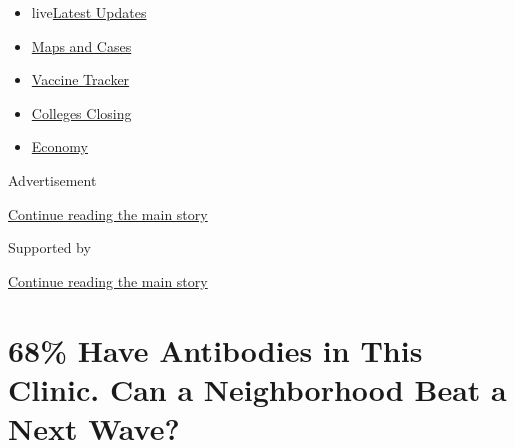 \begin{itemize}
\tightlist
\item
  live\href{https://www.nytimes3xbfgragh.onion/2020/08/20/world/coronavirus-covid.html?name=styln-coronavirus-national\&region=TOP_BANNER\&variant=undefined\&block=storyline_menu_recirc\&action=click\&pgtype=Article\&impression_id=3583c991-e38b-11ea-97c1-25b780906619}{Latest
  Updates}
\item
  \href{https://www.nytimes3xbfgragh.onion/interactive/2020/us/coronavirus-us-cases.html?name=styln-coronavirus-national\&region=TOP_BANNER\&variant=undefined\&block=storyline_menu_recirc\&action=click\&pgtype=Article\&impression_id=3583c992-e38b-11ea-97c1-25b780906619}{Maps
  and Cases}
\item
  \href{https://www.nytimes3xbfgragh.onion/interactive/2020/science/coronavirus-vaccine-tracker.html?name=styln-coronavirus-national\&region=TOP_BANNER\&variant=undefined\&block=storyline_menu_recirc\&action=click\&pgtype=Article\&impression_id=3583c993-e38b-11ea-97c1-25b780906619}{Vaccine
  Tracker}
\item
  \href{https://www.nytimes3xbfgragh.onion/2020/08/19/us/colleges-closing-covid.html?name=styln-coronavirus-national\&region=TOP_BANNER\&variant=undefined\&block=storyline_menu_recirc\&action=click\&pgtype=Article\&impression_id=3583c994-e38b-11ea-97c1-25b780906619}{Colleges
  Closing}
\item
  \href{https://www.nytimes3xbfgragh.onion/live/2020/08/20/business/stock-market-today-coronavirus?name=styln-coronavirus-national\&region=TOP_BANNER\&variant=undefined\&block=storyline_menu_recirc\&action=click\&pgtype=Article\&impression_id=3583c995-e38b-11ea-97c1-25b780906619}{Economy}
\end{itemize}

Advertisement

\protect\hyperlink{after-top}{Continue reading the main story}

Supported by

\protect\hyperlink{after-sponsor}{Continue reading the main story}

\hypertarget{68-have-antibodies-in-this-clinic-can-a-neighborhood-beat-a-next-wave}{%
\section{68\% Have Antibodies in This Clinic. Can a Neighborhood Beat a
Next
Wave?}\label{68-have-antibodies-in-this-clinic-can-a-neighborhood-beat-a-next-wave}}

